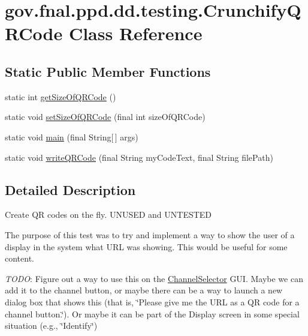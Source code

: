 \hypertarget{classgov_1_1fnal_1_1ppd_1_1dd_1_1testing_1_1CrunchifyQRCode}{\section{gov.\-fnal.\-ppd.\-dd.\-testing.\-Crunchify\-Q\-R\-Code Class Reference}
\label{classgov_1_1fnal_1_1ppd_1_1dd_1_1testing_1_1CrunchifyQRCode}
}
\subsection*{Static Public Member Functions}
\begin{DoxyCompactItemize}
\item 
static int \hyperlink{classgov_1_1fnal_1_1ppd_1_1dd_1_1testing_1_1CrunchifyQRCode_af4be69ca0eb9d5feb41321c2e83ec82c}{get\-Size\-Of\-Q\-R\-Code} ()
\item 
static void \hyperlink{classgov_1_1fnal_1_1ppd_1_1dd_1_1testing_1_1CrunchifyQRCode_a1ebe1abb8380d254de65ba4879e2ae5e}{set\-Size\-Of\-Q\-R\-Code} (final int size\-Of\-Q\-R\-Code)
\item 
static void \hyperlink{classgov_1_1fnal_1_1ppd_1_1dd_1_1testing_1_1CrunchifyQRCode_aaca0af77f34556399df2292994d3c4f5}{main} (final String\mbox{[}$\,$\mbox{]} args)
\item 
static void \hyperlink{classgov_1_1fnal_1_1ppd_1_1dd_1_1testing_1_1CrunchifyQRCode_a2d32209f16dc9bd5b114512ed653fb7a}{write\-Q\-R\-Code} (final String my\-Code\-Text, final String file\-Path)
\end{DoxyCompactItemize}


\subsection{Detailed Description}
Create Q\-R codes on the fly. U\-N\-U\-S\-E\-D and U\-N\-T\-E\-S\-T\-E\-D 

The purpose of this test was to try and implement a way to show the user of a display in the system what U\-R\-L was showing. This would be useful for some content. 

{\itshape T\-O\-D\-O}\-: Figure out a way to use this on the \hyperlink{classgov_1_1fnal_1_1ppd_1_1dd_1_1ChannelSelector}{Channel\-Selector} G\-U\-I. Maybe we can add it to the channel button, or maybe there can be a way to launch a new dialog box that shows this (that is, \char`\"{}\-Please give me the U\-R\-L as a Q\-R code for a channel button.\char`\"{}). Or maybe it can be part of the Display screen in some special situation (e.\-g., \char`\"{}\-Identify\char`\"{}) 

